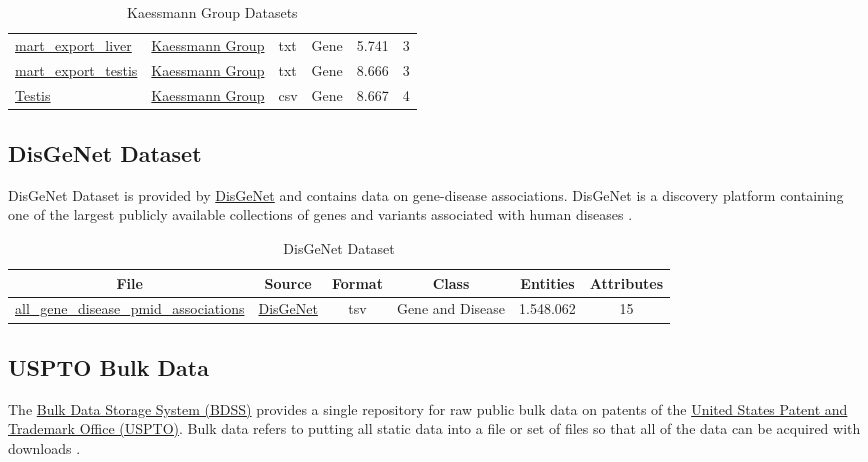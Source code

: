 \documentclass{article}
\begin{document}
\begin{table}[!ht]
\begin{footnotesize}
\begin{tabularx}{\textwidth}{|l|l|l|l|l|l|}
\href{https://nahorgebre.s3.amazonaws.com/mart_export_liver.txt}{mart\_export\_liver} & \href{https://www.zmbh.uni-heidelberg.de/kaessmann/}{Kaessmann Group} & txt & Gene & 5.741 & 3 \\
\href{https://nahorgebre.s3.amazonaws.com/mart_export_testis.txt}{mart\_export\_testis} & \href{https://www.zmbh.uni-heidelberg.de/kaessmann/}{Kaessmann Group} & txt & Gene & 8.666 & 3 \\
\href{https://nahorgebre.s3.amazonaws.com/Testis.csv}{Testis} & \href{https://www.zmbh.uni-heidelberg.de/kaessmann/}{Kaessmann Group}  & csv & Gene & 8.667 & 4 \\
\hline
\end{tabularx}
\end{footnotesize}
\caption{Kaessmann Group Datasets \cite{CardosoMoreira2019GeneEA}}
\end{table}

\subsection{DisGeNet Dataset}
\label{disgenet}
DisGeNet Dataset is provided by \href{https://www.disgenet.org/}{DisGeNet} and contains data on gene-disease associations. DisGeNet is a discovery platform containing one of the largest publicly available collections of genes and variants associated with human diseases \cite{Piero2019TheDK}.
 
\begin{table}[!ht]
\setlength\extrarowheight{2pt} %
\begin{footnotesize}
\begin{tabularx}{\textwidth}{|C|C|C|C|C|C|}
\hline
\textbf{File} & \textbf{Source} & \textbf{Format} & \textbf{Class} & \textbf{Entities} & \textbf{Attributes} \\
\hline
\href{https://nahorgebre.s3.amazonaws.com/all_gene_disease_pmid_associations.tsv}{all\_gene\_disease\_pmid\_associations} & \href{https://www.disgenet.org/}{DisGeNet}  & tsv & Gene and Disease & 1.548.062 & 15 \\
\hline
\end{tabularx}
\end{footnotesize}
\caption{DisGeNet Dataset \cite{Piero2019TheDK}}
\end{table}

\subsection{USPTO Bulk Data}
\label{uspto}
The \href{https://bulkdata.uspto.gov/}{Bulk Data Storage System (BDSS)} provides a single repository for raw public bulk data on patents of the \href{https://www.uspto.gov/}{United States Patent and Trademark Office (USPTO)}. Bulk data refers to putting all static data into a file or set of files so that all of the data can be acquired with downloads \cite{Uspto}.
\end{document}
